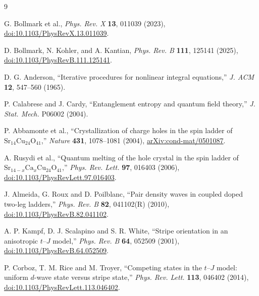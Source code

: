 \documentclass[11pt]{article}
\begin{document}
\begin{thebibliography}{9}

G. Bollmark et al.,
\emph{Phys. Rev. X} \textbf{13}, 011039 (2023),
\href{https://doi.org/10.1103/PhysRevX.13.011039}
{doi:10.1103/PhysRevX.13.011039}.

D. Bollmark, N. Kohler, and A. Kantian,
\emph{Phys. Rev. B} \textbf{111}, 125141 (2025),
\href{https://doi.org/10.1103/PhysRevB.111.125141}
{doi:10.1103/PhysRevB.111.125141}.

D. G. Anderson, ``Iterative procedures for nonlinear integral equations,''
\emph{J. ACM} \textbf{12}, 547--560 (1965).

P. Calabrese and J. Cardy, ``Entanglement entropy and quantum field theory,''
\emph{J. Stat. Mech.} P06002 (2004).

P. Abbamonte et al., ``Crystallization of charge holes in the spin ladder of
\(\mathrm{Sr}_{14}\mathrm{Cu}_{24}\mathrm{O}_{41}\),''
\emph{Nature} \textbf{431}, 1078--1081 (2004),
\href{https://arxiv.org/abs/cond-mat/0501087}{arXiv:cond-mat/0501087}.

A. Rusydi et al., ``Quantum melting of the hole crystal in the spin ladder of
\(\mathrm{Sr}_{14-x}\mathrm{Ca}_{x}\mathrm{Cu}_{24}\mathrm{O}_{41}\),''
\emph{Phys. Rev. Lett.} \textbf{97}, 016403 (2006),
\href{https://doi.org/10.1103/PhysRevLett.97.016403}{doi:10.1103/PhysRevLett.97.016403}.

J. Almeida, G. Roux and D. Poilblanc, ``Pair density waves in coupled doped
two-leg ladders,'' \emph{Phys. Rev. B} \textbf{82}, 041102(R) (2010),
\href{https://doi.org/10.1103/PhysRevB.82.041102}{doi:10.1103/PhysRevB.82.041102}.

A. P. Kampf, D. J. Scalapino and S. R. White, ``Stripe orientation in an
anisotropic \(t\)--\(J\) model,'' \emph{Phys. Rev. B} \textbf{64}, 052509 (2001),
\href{https://doi.org/10.1103/PhysRevB.64.052509}{doi:10.1103/PhysRevB.64.052509}.

P. Corboz, T. M. Rice and M. Troyer, ``Competing states in the \(t\)--\(J\)
model: uniform \(d\)-wave state versus stripe state,''
\emph{Phys. Rev. Lett.} \textbf{113}, 046402 (2014),
\href{https://doi.org/10.1103/PhysRevLett.113.046402}{doi:10.1103/PhysRevLett.113.046402}.

\end{thebibliography}
\end{document}
